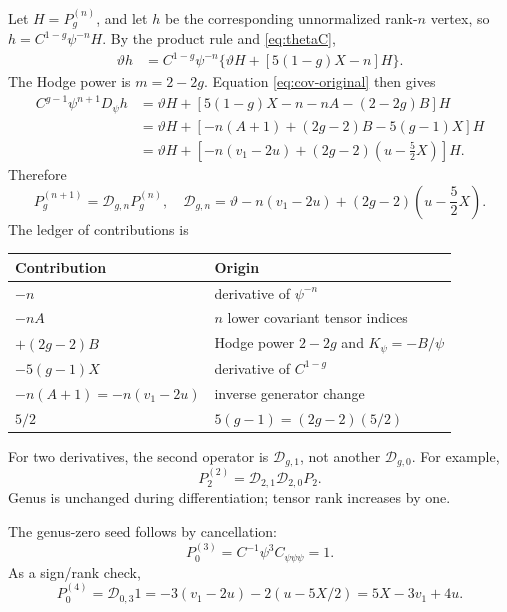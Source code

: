 \documentclass[11pt,a4paper]{article}
\numberwithin{equation}{section}
\newcommand{\tht}{\vartheta}
\newcommand{\Pg}[2]{P_{#1}^{(#2)}}
\begin{document}
Let $H=\Pg gn$, and let $h$ be the corresponding unnormalized rank-$n$
vertex, so $h=C^{1-g}\psi^{-n}H$. By the product rule and \eqref{eq:thetaC},
\begin{align}
\tht h
 &=C^{1-g}\psi^{-n}
       \{\tht H+[5(1-g)X-n]H\}.
\end{align}
The Hodge power is $m=2-2g$. Equation \eqref{eq:cov-original} then gives
\begin{align}
C^{g-1}\psi^{n+1}D_\psi h
 &=\tht H+[5(1-g)X-n-nA-(2-2g)B]H\\
 &=\tht H+[-n(A+1)+(2g-2)B-5(g-1)X]H\\
 &=\tht H+
   \left[-n(v_1-2u)+(2g-2)\left(u-\frac52X\right)\right]H.
\end{align}
Therefore
\begin{equation}\boxed{
\Pg g{n+1}=\mathcal D_{g,n}\Pg gn,
\quad \mathcal D_{g,n}=\tht-n(v_1-2u)
 +(2g-2)\left(u-\frac52X\right).}\label{eq:cov}
\end{equation}
The ledger of contributions is
\begin{center}
\begin{tabular}{ll}
\toprule
Contribution & Origin\\\midrule
$-n$ & derivative of $\psi^{-n}$\\
$-nA$ & $n$ lower covariant tensor indices\\
$+(2g-2)B$ & Hodge power $2-2g$ and $K_\psi=-B/\psi$\\
$-5(g-1)X$ & derivative of $C^{1-g}$\\
$-n(A+1)=-n(v_1-2u)$ & inverse generator change\\
$5/2$ & $5(g-1)=(2g-2)(5/2)$\\\bottomrule
\end{tabular}
\end{center}
For two derivatives, the second operator is $\mathcal D_{g,1}$,
not another $\mathcal D_{g,0}$. For example,
\begin{equation}
\Pg 22=\mathcal D_{2,1}\mathcal D_{2,0}P_2.
\end{equation}
Genus is unchanged during differentiation; tensor rank increases by one.

The genus-zero seed follows by cancellation:
\begin{equation}
\Pg 03=C^{-1}\psi^3C_{\psi\psi\psi}=1.
\end{equation}
As a sign/rank check,
\begin{equation}
\Pg 04=\mathcal D_{0,3}1
 =-3(v_1-2u)-2(u-5X/2)=5X-3v_1+4u.
\end{equation}
\end{document}
